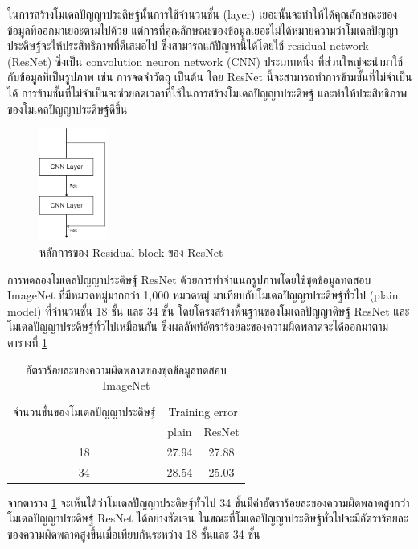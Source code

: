 ในการสร้างโมเดลปัญญาประดิษฐ์นั้นการใช้จำนวนชั้น (layer) เยอะนั้นจะทำให้ได้คุณลักษณะของข้อมูลที่ออกมาเยอะตามไปด้วย 
แต่การที่คุณลักษณะของข้อมูลเยอะไม่ได้หมายความว่าโมเดลปัญญาประดิษฐ์จะให้ประสิทธิภาพที่ดีเสมอไป ซึ่งสามารถแก้ปัญหานี้ได้โดยใช้ residual network (ResNet) 
ซึ่งเป็น convolution neuron network (CNN) ประเภทหนึ่ง ที่ส่วนใหญ่จะนำมาใช้กับข้อมูลที่เป็นรูปภาพ เช่น การจดจำวัตถุ เป็นต้น โดย ResNet นี้จะสามารถทำการข้ามชั้นที่ไม่จำเป็นได้ 
การข้ามชั้นที่ไม่จำเป็นจะช่วยลดเวลาที่ใช้ในการสร้างโมเดลปัญญาประดิษฐ์ และทำให้ประสิทธิภาพของโมเดลปัญญาประดิษฐ์ดีขึ้น

\begin{figure}[!ht]
	\centering
	\includegraphics[width=0.2\textwidth]{chapter2/images/example_resnet.png}
		\caption{หลักการของ Residual block ของ ResNet}
    	\label{fig:ResNet}
\end{figure}

การทดลองโมเดลปัญญาประดิษฐ์ ResNet ด้วยการทำจำแนกรูปภาพโดยใช้ชุดข้อมูลทดสอบ ImageNet ที่มีหมวดหมู่มากกว่า 1,000 หมวดหมู่
มาเทียบกับโมเดลปัญญาประดิษฐ์ทั่วไป (plain model) ที่จำนวนชั้น 18 ชั้น และ 34 ชั้น โดยโครงสร้างพื้นฐานของโมเดลปัญญาดิษฐ์ ResNet และโมเดลปัญญาประดิษฐ์ทั่วไปเหมือนกัน 
ซึ่งผลลัพท์อัตราร้อยละของความผิดพลาดจะได้ออกมาตามตารางที่ \ref{tab: Top-1 error of ImageNet} 

\begin{table}[!ht]
	\centering
	\begin{tabular}{|c|c|c|}
		\hline
		{จำนวนชั้นของโมเดลปัญญาประดิษฐ์}&\multicolumn{2}{c|}{Training error}\\
		\cline{2-3}
		{}							& plain						& ResNet			\\
		\hline
		18							& 27.94						& 27.88				\\
		34							& 28.54						& 25.03				\\
		\hline
	\end{tabular}
	\caption{อัตราร้อยละของความผิดพลาดของชุดข้อมูลทดสอบ ImageNet}
	\label{tab: Top-1 error of ImageNet}
\end{table}
\clearpage

จากตาราง \ref{tab: Top-1 error of ImageNet} จะเห็นได้ว่าโมเดลปัญญาประดิษฐ์ทั่วไป 34 ชั้นมีค่าอัตราร้อยละของความผิดพลาดสูงกว่าโมเดลปัญญาประดิษฐ์ ResNet 
ได้อย่างชัดเจน ในขณะที่โมเดลปัญญาประดิษฐ์ทั่วไปจะมีอัตราร้อยละของความผิดพลาดสูงขึ้นเมื่อเทียบกันระหว่าง 18 ชั้นและ 34 ชั้น

